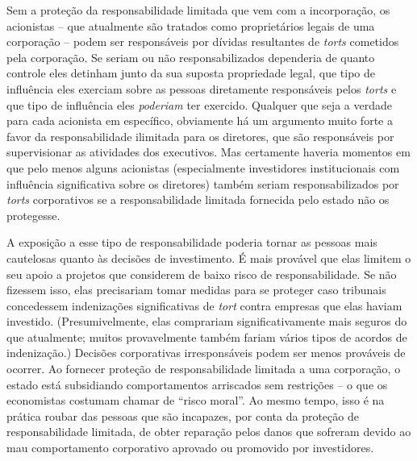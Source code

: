 Sem a proteção da responsabilidade limitada que vem com a incorporação, os acionistas -- que atualmente são tratados como proprietários legais de uma corporação -- podem ser responsáveis por dívidas resultantes de \emph{torts} cometidos pela corporação. Se seriam ou não responsabilizados dependeria de quanto controle eles detinham junto da sua suposta propriedade legal, que tipo de influência eles exerciam sobre as pessoas diretamente responsáveis pelos \emph{torts} e que tipo de influência eles \emph{poderiam} ter exercido. Qualquer que seja a verdade para cada acionista em específico, obviamente há um argumento muito forte a favor da responsabilidade ilimitada para os diretores, que são responsáveis por supervisionar as atividades dos executivos. Mas certamente haveria momentos em que pelo menos alguns acionistas (especialmente investidores institucionais com influência significativa sobre os diretores) também seriam responsabilizados por \emph{torts} corporativos se a responsabilidade limitada fornecida pelo estado não os protegesse.

A exposição a esse tipo de responsabilidade poderia tornar as pessoas mais cautelosas quanto às decisões de investimento. É mais provável que elas limitem o seu apoio a projetos que considerem de baixo risco de responsabilidade. Se não fizessem isso, elas precisariam tomar medidas para se proteger caso tribunais concedessem indenizações significativas de \emph{tort} contra empresas que elas haviam investido. (Presumivelmente, elas comprariam significativamente mais seguros do que atualmente; muitos provavelmente também fariam vários tipos de acordos de indenização.) Decisões corporativas irresponsáveis podem ser menos prováveis de ocorrer. Ao fornecer proteção de responsabilidade limitada a uma corporação, o estado está subsidiando comportamentos arriscados sem restrições -- o que os economistas costumam chamar de ``risco moral''. Ao mesmo tempo, isso é na prática roubar das pessoas que são incapazes, por conta da proteção de responsabilidade limitada, de obter reparação pelos danos que sofreram devido ao mau comportamento corporativo aprovado ou promovido por investidores. 

